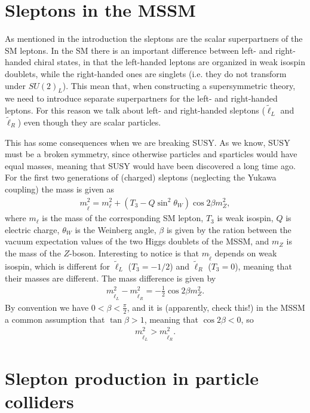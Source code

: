 \documentclass[twocolumn,a4paper,10pt]{article}
\begin{document}
\section{Sleptons in the MSSM}

As mentioned in the introduction the sleptons are the scalar superpartners of the SM leptons. In the 
SM there is an important difference between left- and right-handed chiral states, in that the 
left-handed leptons are organized in weak isospin doublets, while the right-handed ones are singlets 
(i.e. they do not transform under $SU(2)_L$). This mean that, when constructing a supersymmetric theory, 
we need to introduce separate superpartners for the left- and right-handed leptons. For this reason we 
talk about left- and right-handed sleptons ($\tilde{\ell}_L$ and $\tilde{\ell}_R$) even though they are 
scalar particles. 

This has some consequences when we are breaking SUSY. As we know, SUSY must be a broken symmetry, 
since otherwise particles and sparticles would have equal masses, meaning that SUSY would have been 
discovered a long time ago. For the first two generations of (charged) sleptons (neglecting the 
Yukawa coupling) the mass is given as
\begin{align}
m_{\tilde{\ell}}^2 = m_{\ell}^2 + (T_3 - Q\sin^2\theta_W)\cos 2\beta m_Z^2, 
\end{align}  
where $m_{\ell}$ is the  mass of the corresponding SM lepton, $T_3$ is weak isospin, $Q$ is 
electric charge, $\theta_W$ is the Weinberg angle, $\beta$ is given by the ration between the 
vacuum expectation values of the two Higgs doublets of the MSSM, and $m_Z$ is the mass of the $Z$-boson.
Interesting to notice is that $m_{\tilde{\ell}}$ depends on weak isospin, which is different for 
$\tilde{\ell}_L$ ($T_3 = -1/2$) and $\tilde{\ell}_R$ ($T_3 = 0$), meaning that their masses are 
different. The mass difference is given by 
\begin{align}
m_{\tilde{\ell}_L}^2 - m_{\tilde{\ell}_R}^2 = -\frac{1}{2}\cos 2\beta m_Z^2.  
\end{align}  
By convention we have $0 < \beta < \frac{\pi}{2}$, and it is (apparently, check this!) in the MSSM a 
common assumption that $\tan\beta > 1$, meaning that $\cos 2\beta < 0$, so 
\begin{align*}
m_{\tilde{\ell}_L}^2 > m_{\tilde{\ell}_R}^2. 
\end{align*} 

\section{Slepton production in particle colliders}
\end{document}
